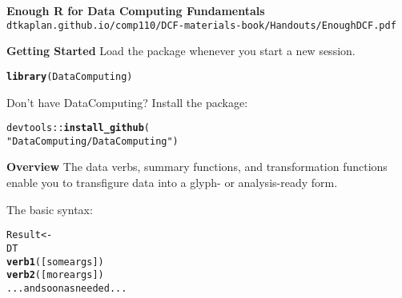 \documentclass{report}\usepackage[]{graphicx}\usepackage[]{color}
\makeatletter
\newcommand{\hlstr}[1]{\textcolor[rgb]{0.192,0.494,0.8}{#1}}%
\newcommand{\hlopt}[1]{\textcolor[rgb]{0,0,0}{#1}}%
\newcommand{\hlstd}[1]{\textcolor[rgb]{0.345,0.345,0.345}{#1}}%
\newcommand{\hlkwd}[1]{\textcolor[rgb]{0.737,0.353,0.396}{\textbf{#1}}}%
\newenvironment{kframe}{%
 \def\at@end@of@kframe{}%
 \ifinner\ifhmode%
  \def\at@end@of@kframe{\end{minipage}}%
  \begin{minipage}{\columnwidth}%
 \fi\fi%
 \def\FrameCommand##1{\hskip\@totalleftmargin \hskip-\fboxsep
 \colorbox{shadecolor}{##1}\hskip-\fboxsep
     \hskip-\linewidth \hskip-\@totalleftmargin \hskip\columnwidth}%
 \MakeFramed {\advance\hsize-\width
   \@totalleftmargin\z@ \linewidth\hsize
   \@setminipage}}%
 {\par\unskip\endMakeFramed%
 \at@end@of@kframe}
\newenvironment{knitrout}{}{} %
\newcommand{\asection}[1]{{\sf\bfseries #1}}
\renewenvironment{knitrout}{\vspace*{-.1in}}{\vspace*{-.1in}} %
\makeatother
\begin{document}
\parindent=0pt

\vspace*{-.85in}\begin{center}
{\sf \bfseries \Large Enough R for Data Computing Fundamentals}\\
\texttt{dtkaplan.github.io/comp110/DCF-materials-book/Handouts/EnoughDCF.pdf}
\end{center}

\def\opt#1{#1}
\def\squeeze{\vspace*{-4ex}}

\begin{multicols}{4}
\raggedright

\small
\asection{Getting Started} Load the package whenever you start a new session.

\begin{knitrout}
\color{fgcolor}\begin{kframe}
\begin{alltt}
\hlkwd{library}\hlstd{(DataComputing)}
\end{alltt}
\end{kframe}
\end{knitrout}
Don't have DataComputing?  Install the package:
\begin{knitrout}
\color{fgcolor}\begin{kframe}
\begin{alltt}
\hlstd{devtools}\hlopt{::}\hlkwd{install_github}\hlstd{(}
  \hlstr{"DataComputing/DataComputing"}\hlstd{)}
\end{alltt}
\end{kframe}
\end{knitrout}

\smallskip

\asection{Overview} The data verbs, summary functions, and transformation functions enable you to transfigure data into a glyph- or analysis-ready form.

\smallskip

The basic syntax:
\begin{knitrout}
\color{fgcolor}\begin{kframe}
\begin{alltt}
Result <-
  DT %>% 
  \hlkwd{verb1}( [some args] ) %>%
  \hlkwd{verb2}( [more args] ) %>%
  ... and so on as needed ...
\end{alltt}
\end{kframe}
\end{knitrout}


\end{multicols}
\end{document}
